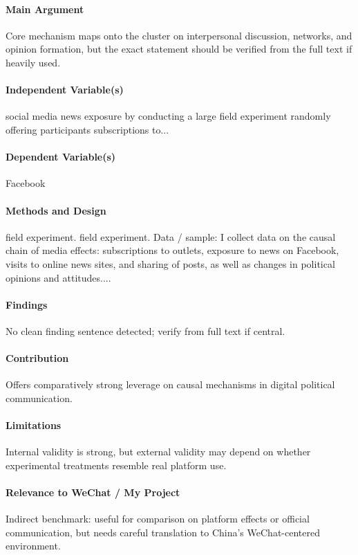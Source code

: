 \documentclass[12pt]{article}
\begin{document}
\paragraph{Main Argument} Core mechanism maps onto the cluster on interpersonal discussion, networks, and opinion formation, but the exact statement should be verified from the full text if heavily used.

\paragraph{Independent Variable(s)} social media news exposure by conducting a large field experiment randomly offering participants subscriptions to...

\paragraph{Dependent Variable(s)} Facebook

\paragraph{Methods and Design} field experiment. field experiment. Data / sample: I collect data on the causal chain of media effects: subscriptions to outlets, exposure to news on Facebook, visits to online news sites, and sharing of posts, as well as changes in political opinions and attitudes....

\paragraph{Findings} No clean finding sentence detected; verify from full text if central.

\paragraph{Contribution} Offers comparatively strong leverage on causal mechanisms in digital political communication.

\paragraph{Limitations} Internal validity is strong, but external validity may depend on whether experimental treatments resemble real platform use.

\paragraph{Relevance to WeChat / My Project} Indirect benchmark: useful for comparison on platform effects or official communication, but needs careful translation to China's WeChat-centered environment.
\end{document}
